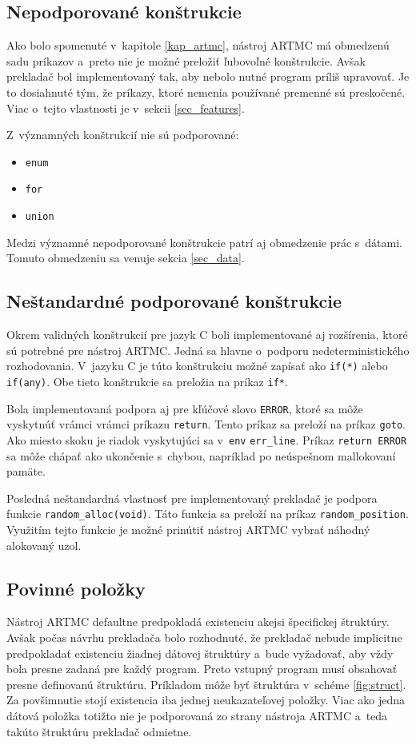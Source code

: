 \subsection{Nepodporované konštrukcie}
Ako bolo spomenuté v~kapitole \ref{kap_artmc}, nástroj ARTMC má obmedzenú sadu príkazov a~preto nie je možné preložiť ľubovoľné konštrukcie. Avšak prekladač bol implementovaný tak, aby nebolo nutné program príliš upravovať. Je to dosiahnuté tým, že príkazy, ktoré nemenia používané premenné sú preskočené. Viac o~tejto vlastnosti je v~sekcii \ref{sec_features}.

Z~významných konštrukcií nie sú podporované:
\begin{itemize}
\item \texttt{enum}
\item \texttt{for}
\item \texttt{union}
\end{itemize}

Medzi významné nepodporované konštrukcie patrí aj obmedzenie prác s~dátami. Tomuto obmedzeniu sa venuje sekcia \ref{sec_data}.

\subsection{Neštandardné podporované konštrukcie}
Okrem validných konštrukcií pre jazyk C boli implementované aj rozšírenia, ktoré sú potrebné pre nástroj ARTMC. Jedná sa hlavne o~podporu nedeterministického rozhodovania. V~jazyku C je túto konštrukciu možné zapísať ako \texttt{if(*)} alebo \texttt{if(any)}. Obe tieto konštrukcie sa preložia na príkaz \texttt{if*}.

Bola implementovaná podpora aj pre kľúčové slovo \texttt{ERROR}, ktoré sa môže vyskytnúť vrámci vrámci príkazu \texttt{return}. Tento príkaz sa preloží na príkaz \texttt{goto}. Ako miesto skoku je riadok vyskytujúci sa v~\texttt{env} \texttt{err\_line}. Príkaz \texttt{return ERROR} sa môže chápať ako ukončenie s~chybou, napríklad po neúspešnom mallokovaní pamäte.

Posledná neštandardná vlastnosť pre implementovaný prekladač je podpora funkcie \texttt{random\_alloc(void)}. Táto funkcia sa preloží na príkaz \texttt{random\_position}. Využitím tejto funkcie je možné prinútiť nástroj ARTMC vybrať náhodný alokovaný uzol.

\subsection{Povinné položky}
Nástroj ARTMC defaultne predpokladá existenciu akejsi špecifickej štruktúry. Avšak počas návrhu prekladača bolo rozhodnuté, že prekladač nebude implicitne predpokladať existenciu žiadnej dátovej štruktúry a~bude vyžadovať, aby vždy bola presne zadaná pre každý program. Preto vstupný program musí obsahovať presne definovanú štruktúru. Príkladom môže byť štruktúra v~schéme \ref{fig:struct}. Za povšimnutie stojí existencia iba jednej neukazateľovej položky. Viac ako jedna dátová položka totižto nie je podporovaná zo strany nástroja ARTMC a~teda takúto štruktúru prekladač odmietne.

